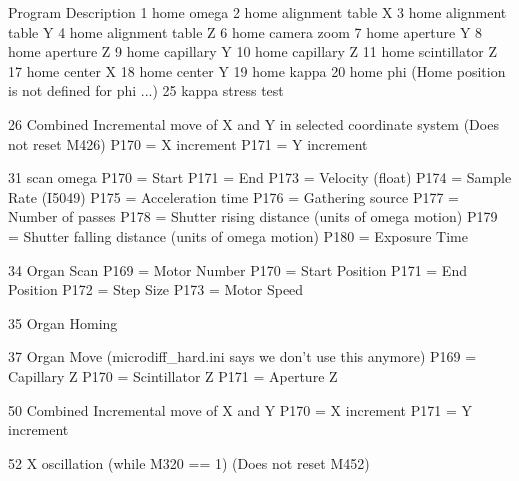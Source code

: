 \begin{DoxyPre}Program		Description
  1		home omega
  2		home alignment table X
  3		home alignment table Y
  4		home alignment table Z
  6		home camera zoom
  7		home aperture Y
  8		home aperture Z
  9		home capillary Y
 10		home capillary Z
 11		home scintillator Z
 17		home center X
 18		home center Y
 19		home kappa
 20		home phi (Home position is not defined for phi ...)
 25		kappa stress test\end{DoxyPre}



\begin{DoxyPre} 26		Combined Incremental move of X and Y in selected coordinate system
			(Does not reset M426)
			P170  = X increment
			P171  = Y increment\end{DoxyPre}



\begin{DoxyPre} 31		scan omega
			P170  = Start
			P171  = End
			P173  = Velocity (float)
			P174  = Sample Rate (I5049)
			P175  = Acceleration time
			P176  = Gathering source
			P177  = Number of passes
			P178  = Shutter rising distance (units of omega motion)
			P179  = Shutter falling distance (units of omega motion)
			P180  = Exposure Time\end{DoxyPre}



\begin{DoxyPre} 34		Organ Scan
			P169  = Motor Number
			P170  = Start Position
			P171  = End Position
			P172  = Step Size
			P173  = Motor Speed\end{DoxyPre}



\begin{DoxyPre} 35		Organ Homing\end{DoxyPre}



\begin{DoxyPre} 37		Organ Move   (microdiff\_hard.ini says we don't use this anymore)
			P169  = Capillary Z
			P170  = Scintillator Z
			P171  = Aperture Z\end{DoxyPre}



\begin{DoxyPre} 50		Combined Incremental move of X and Y
			P170  = X increment
			P171  = Y increment\end{DoxyPre}



\begin{DoxyPre} 52		X oscillation (while M320 == 1)
			(Does not reset M452)\end{DoxyPre}



